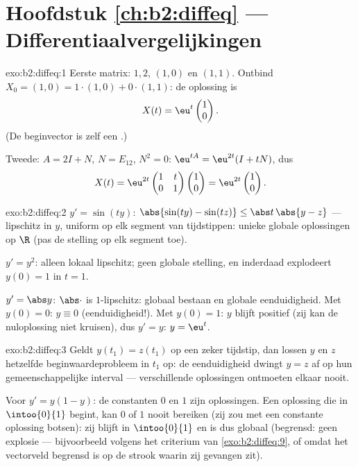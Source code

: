 \section*{Hoofdstuk \ref{ch:b2:diffeq} --- Differentiaalvergelijkingen}

\begin{solution}{exo:b2:diffeq:1}
Eerste matrix:  $1, 2$,  $(1,0)$ en
$(1,1)$. Ontbind $X_0 = (1,0) = 1\cdot(1,0) + 0\cdot(1,1)$: de
oplossing is
\[
X(t) = \eu^{t}\begin{pmatrix}1\\ 0\end{pmatrix} .
\]
(De beginvector is zelf een .)

Tweede: $A = 2I + N$, $N = E_{12}$, $N^2 = 0$: $\eu^{tA} =
\eu^{2t}(I + tN)$, dus
\[
X(t) = \eu^{2t}\begin{pmatrix} 1 & t\\ 0 & 1\end{pmatrix}
\begin{pmatrix}1\\ 0\end{pmatrix}
= \eu^{2t}\begin{pmatrix}1\\ 0\end{pmatrix}.
\]
\end{solution}

\begin{solution}{exo:b2:diffeq:2}
$y' = \sin(ty)$: $\abs{\sin(ty) - \sin(tz)} \leq \abs t\,\abs{y -
z}$ --- lipschitz in $y$, uniform op elk segment van tijdstippen:
unieke globale oplossingen op $\R$ (pas de stelling op elk segment
toe).

$y' = y^2$: alleen lokaal lipschitz; geen globale stelling, en
inderdaad explodeert $y(0) = 1$ in $t = 1$.

$y' = \abs y$: $\abs\cdot$ is $1$-lipschitz: globaal bestaan en
globale eenduidigheid. Met $y(0) = 0$: $y \equiv 0$
(eenduidigheid!). Met $y(0) = 1$: $y$ blijft positief (zij kan de
nuloplossing niet kruisen), dus $y' = y$: $y = \eu^t$.
\end{solution}

\begin{solution}{exo:b2:diffeq:3}
Geldt $y(t_1) = z(t_1)$ op een zeker tijdstip, dan lossen $y$ en
$z$ hetzelfde beginwaardeprobleem in $t_1$ op: de eenduidigheid
dwingt $y = z$ af op hun gemeenschappelijke interval ---
verschillende oplossingen ontmoeten elkaar nooit.

Voor $y' = y(1-y)$: de constanten $0$ en $1$ zijn oplossingen. Een
oplossing die in $\intoo{0}{1}$ begint, kan $0$ of $1$ nooit
bereiken (zij zou met een constante oplossing botsen): zij blijft
in $\intoo{0}{1}$ en is dus globaal (begrensd: geen explosie ---
bijvoorbeeld volgens het criterium van \cref{exo:b2:diffeq:9}, of
omdat het vectorveld begrensd is op de strook waarin zij gevangen
zit).
\end{solution}

